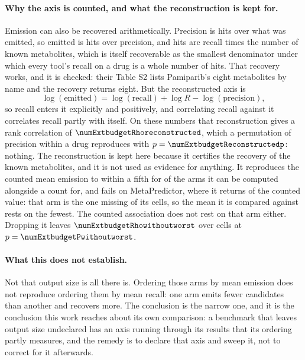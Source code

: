 \documentclass[journal=jcisd8,manuscript=suppinfo,layout=onecolumn]{achemso}
\begin{document}
\paragraph{Why the axis is counted, and what the reconstruction is kept for.} Emission can also be
recovered arithmetically. Precision is hits over what was emitted, so emitted is hits over
precision, and hits are recall times the number of known metabolites, which is itself recoverable as the
smallest denominator under which every tool's recall on a drug is a whole number of hits. That
recovery works, and it is checked: their Table S2 lists Pamiparib's eight metabolites by name and
the recovery returns eight. But the reconstructed axis is
\[
  \log(\text{emitted}) = \log(\text{recall}) + \log R - \log(\text{precision}),
\]
so recall enters it explicitly and positively, and correlating recall against it correlates recall
partly with itself. On these numbers that reconstruction gives a rank correlation of
$\numExtbudgetRhoreconstructed$, which a permutation of precision within a drug reproduces with
$p = \numExtbudgetReconstructedp$: nothing. The reconstruction is kept here because it certifies the recovery of the known metabolites, and it is not used as evidence for anything. It reproduces the counted
mean emission to within a fifth for \numExtbudgetAgreeingarmsWord{} of the
\numExtbudgetCountedarmsWord{} arms it can be computed alongside a count for, and fails on
MetaPredictor, where it returns \numExtbudgetWorstratio{} of the counted value: that arm is the one
missing \numExtbudgetWorstarmabsentWord{} of its cells, so the mean it is compared against rests on
the fewest. The counted association does not rest on that arm either. Dropping it leaves
$\numExtbudgetRhowithoutworst$ over \numExtbudgetCellswithoutworst{} cells at
$p = \numExtbudgetPwithoutworst$.

\paragraph{What this does not establish.} Not that output size is all there is. Ordering those arms
by mean emission does not reproduce ordering them by mean recall: one arm emits fewer candidates
than another and recovers more. The conclusion is the narrow one, and it is the conclusion this
work reaches about its own comparison: a benchmark that leaves output size undeclared has an axis
running through its results that its ordering partly measures, and the remedy is to declare that
axis and sweep it, not to correct for it afterwards.
\end{document}
